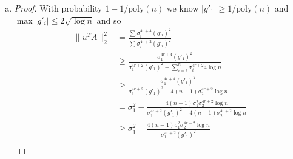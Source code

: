 \documentclass[11pt]{article}
\begin{document}
\begin{enumerate}[1.]
\begin{enumerate}[(a)]
\begin{proof}
\begin{align*}
  \|y\|_2^2 &= \|U \Sigma^{2r+1}g'\|_2^2\\
  &= \left\|U\begin{pmatrix} \sigma_1^{2r+1} g'_1\\ \vdots \\ \sigma_n^{2r+1}g'_n \end{pmatrix}\right\|_2^2\\
  &= \left\|\sum_{i=1}^{n} \sigma_i^{2r+1} g_i' u_i\right\|_2^2\\
  &= \sum_{i=1}^{n} \left\| \sigma_i^{2r+1} g_i' u_i \right\|_2^2 &\text{Pythagorean since }U \text{ has orthonormal columns}\\
  &= \sum_{i=1}^n \sigma_i^{4r+2}(g_i')^2.
\end{align*}
Similarly,
\begin{align*}
\|y^TA\|_2^2 &= \| (g')^T \Sigma^{2r+1} U^T U \Sigma V^T\|_2^2\\
&= \| (g')^T \Sigma^{2r+2} V^T\|_2^2\\
&= \| V \Sigma^{2r+2}g'\|_2^2\\
&= \sum_{i=1}^n \sigma_i^{4r+4}(g'_i)^2. &\text{same reason as above}
\end{align*}
We can then conclude that
\begin{align*}
  \|u^T A\|_2^2 &= \left\| \frac{y^T}{\|y^T\|_2} A \right\|_2^2\\
  &= \frac{\|y^T A\|_2^2}{\|y\|_2^2}\\
  &= \frac{\sum \sigma_i^{4r+4} (g'_i)^2}{\sum \sigma_i^{4r+2}(g'_i)^2}
\end{align*}
as desired.
\end{proof}
\item \begin{proof}
With probability $1 - 1/\text{poly}(n)$ we know $|g'_1| \ge 1/\text{poly}(n)$ and $\max |g'_i| \le 2\sqrt{\log n}$ and so 
\begin{align*}
  \|u^T A\|_2^2 &= \frac{\sum \sigma_i^{4r+4} (g'_i)^2}{\sum \sigma_i^{4r+2}(g'_i)^2}\\
  &\ge \frac{\sigma_1^{4r+4}(g'_1)^2}{\sigma_1^{4r+2}(g'_1)^2 + \sum_{i=2}^n \sigma_i^{4r+2} 4\log n}\\
  &\ge \frac{\sigma_1^{4r+4}(g'_1)^2}{\sigma_1^{4r+2}(g'_1)^2 + 4(n-1) \sigma_2^{4r+2} \log n}\\
  &= \sigma_1^2 - \frac{4(n-1)\sigma_1^2\sigma_2^{4r+2} \log n}{\sigma_1^{4r+2}(g'_1)^2 + 4(n-1) \sigma_2^{4r+2} \log n}\\
  &\ge \sigma_1^2 - \frac{4(n-1)\sigma_1^2 \sigma_2^{4r+2} \log n}{\sigma_1^{4r+2}(g'_1)^2}\\

\end{align*}
\end{proof}
\end{enumerate}
\end{enumerate}
\end{document}
